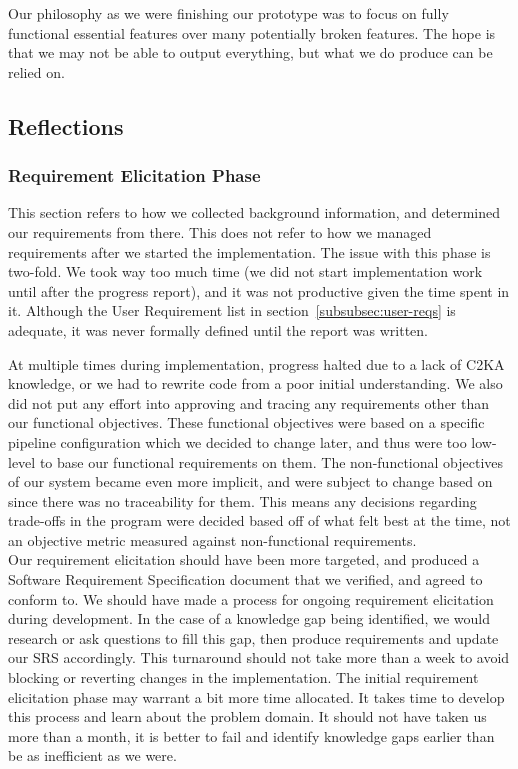 Our philosophy as we were finishing our prototype was to focus on fully functional essential features over many potentially broken features.
The hope is that we may not be able to output everything, but what we do produce can be relied on.


\subsection{Reflections}\label{subsec:reflections}
\subsubsection{Requirement Elicitation Phase}\label{subsubsec:req-elicit-refl}
This section refers to how we collected background information, and determined our requirements from there.
This does not refer to how we managed requirements after we started the implementation.
The issue with this phase is two-fold.
We took way too much time (we did not start implementation work until after the progress report),
and it was not productive given the time spent in it.
Although the User Requirement list in section~\ref{subsubsec:user-reqs} is adequate,
it was never formally defined until the report was written.

At multiple times during implementation, progress halted due to a lack of C2KA knowledge,
or we had to rewrite code from a poor initial understanding.
We also did not put any effort into approving and tracing any requirements other than our functional objectives.
These functional objectives were based on a specific pipeline configuration which we decided to change later,
and thus were too low-level to base our functional requirements on them.
The non-functional objectives of our system became even more implicit, and were subject to change based on
since there was no traceability for them.
This means any decisions regarding trade-offs in the program were decided based off of what felt best at the time,
not an objective metric measured against non-functional requirements.\\

Our requirement elicitation should have been more targeted, and produced a Software Requirement Specification document
that we verified, and agreed to conform to.
We should have made a process for ongoing requirement elicitation during development.
In the case of a knowledge gap being identified, we would research or ask questions to fill this gap,
then produce requirements and update our SRS accordingly.
This turnaround should not take more than a week to avoid blocking or reverting changes in the implementation.
The initial requirement elicitation phase may warrant a bit more time allocated.
It takes time to develop this process and learn about the problem domain.
It should not have taken us more than a month,
it is better to fail and identify knowledge gaps earlier than be as inefficient as we were.

